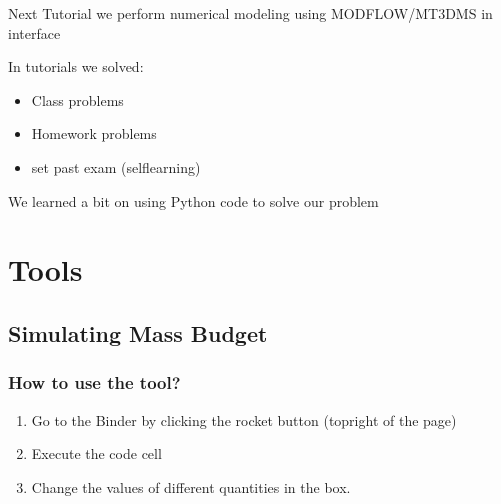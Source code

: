 \documentclass[letterpaper,10pt,english]{jupyterBook}
\begin{document}
\sphinxAtStartPar
Next Tutorial we perform numerical modeling using MODFLOW/MT3DMS in  interface

\sphinxAtStartPar
In tutorials we solved:
\begin{itemize}
\item {} 
 Class problems

\item {} 
 Homework problems

\item {} 
\sphinxhyphen{}set past exam (self\sphinxhyphen{}learning)

\end{itemize}

\sphinxAtStartPar
We learned a bit on using Python code to solve our problem

\sphinxstepscope


\part{Tools}

\sphinxstepscope


\chapter{Simulating Mass Budget}
\label{\detokenize{content/tools/decay:simulating-mass-budget}}\label{\detokenize{content/tools/decay::doc}}
\sphinxAtStartPar
{}


\section{How to use the tool?}
\label{\detokenize{content/tools/decay:how-to-use-the-tool}}\begin{enumerate}
%
\item {} 
\sphinxAtStartPar
Go to the Binder by clicking the rocket button (top\sphinxhyphen{}right of the page)

\item {} 
\sphinxAtStartPar
Execute the code cell

\item {} 
\sphinxAtStartPar
Change the values of different quantities in the box.

\end{enumerate}
\end{document}
